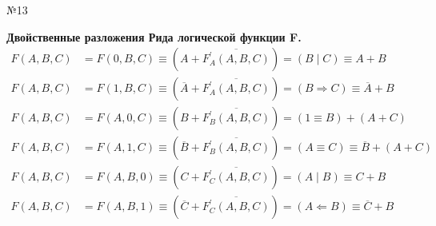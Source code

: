 \documentclass[]{article}
\begin{document}
	\begin{center}\begin{large}{№13}\end{large}\end{center}
	\textbf{Двойственные разложения Рида логической функции F.}
	\[
	\begin{aligned}
	F(A, B, C) &= F(0, B, C)\equiv (A + \overline{F^{'}_A(A,B,C)})=(B\mid C)\equiv A + B\\
	F(A, B, C) &= F(1, B, C)\equiv (\overline{A} + \overline{F^{'}_A(A,B,C)})=(B\Rightarrow C)\equiv \overline{A}+ B\\
	F(A, B, C) &= F(A, 0, C)\equiv (B+ \overline{F^{'}_B(A,B,C)})=(1\equiv B)+(A+C)\\
	F(A, B, C) &= F(A, 1, C)\equiv (\overline{B} + \overline{F^{'}_B(A,B,C)})=(A\equiv C)\equiv\overline{B}+(A+C)\\
	F(A, B, C) &= F(A, B, 0)\equiv (C + \overline{F^{'}_C(A,B,C)})=(A\mid B)\equiv C + B\\
	F(A, B, C) &= F(A, B, 1)\equiv (\overline{C} + \overline{F^{'}_C(A,B,C)})=(A\Leftarrow B)\equiv\overline{C}+ B\\
	\end{aligned}
	\]
\end{document}
